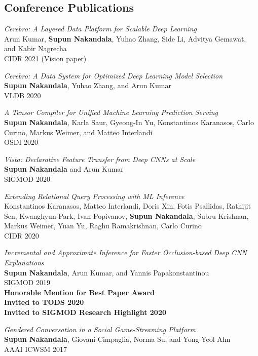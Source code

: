 \documentclass[margin]{res}
\begin{document}
\begin{resume}
\section{Conference Publications}
\par
\textit{Cerebro: A Layered Data Platform for Scalable Deep Learning} \\
Arun Kumar, \textbf{Supun Nakandala}, Yuhao Zhang,  Side Li, Advitya Gemawat, and Kabir
Nagrecha\\
CIDR 2021 (Vision paper)

\par
\textit{Cerebro: A Data System for Optimized Deep Learning Model Selection} \\
\textbf{Supun Nakandala}, Yuhao Zhang, and Arun Kumar\\
VLDB 2020

\par
\textit{A Tensor Compiler for Unified Machine Learning Prediction Serving} \\
\textbf{Supun Nakandala}, Karla Saur, Gyeong-In Yu, Konstantinos Karanasos, Carlo Curino, Markus Weimer, and Matteo Interlandi\\
OSDI 2020

\par
\textit{Vista: Declarative Feature Transfer from Deep CNNs at Scale} \\
\textbf{Supun Nakandala} and Arun Kumar\\
SIGMOD 2020

\par
\textit{Extending Relational Query Processing with ML Inference} \\
Konstantinos Karanasos, Matteo Interlandi, Doris Xin, Fotis Psallidas, Rathijit Sen, Kwanghyun Park, Ivan Popivanov, \textbf{Supun Nakandala}, Subru Krishnan, Markus Weimer, Yuan Yu, Raghu Ramakrishnan, Carlo Curino\\
CIDR 2020

\par
\textit{Incremental and Approximate Inference for Faster Occlusion-based Deep CNN Explanations} \\
\textbf{Supun Nakandala}, Arun Kumar, and Yannis Papakonstantinou \\
SIGMOD 2019 \\
\textbf{Honorable Mention for Best Paper Award\\ Invited to TODS 2020\\ Invited to SIGMOD Research Highlight 2020}

\par
\textit{Gendered Conversation in a Social Game-Streaming Platform} \\
\textbf{Supun Nakandala}, Giovani Cimpaglia, Norma Su, and Yong-Yeol Ahn \\
AAAI ICWSM 2017


\end{resume}
\end{document}
